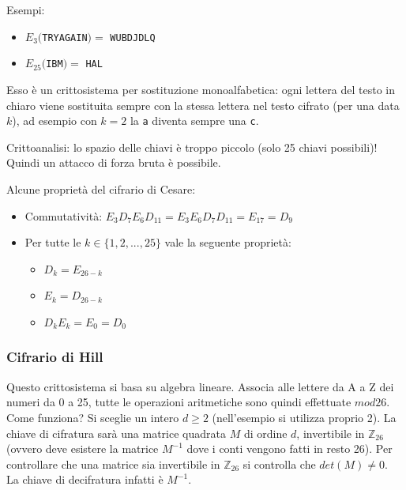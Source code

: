 Esempi:
\begin{itemize}
	\item $E_3($\texttt{TRYAGAIN}$)=$ \texttt{WUBDJDLQ}
	\item $E_{25}($\texttt{IBM}$)=$ \texttt{HAL}
\end{itemize}

Esso è un crittosistema per sostituzione monoalfabetica: ogni lettera del testo in chiaro viene sostituita sempre con la stessa lettera nel testo cifrato (per una data $k$), ad esempio con $k=2$ la \texttt{a} diventa sempre una \texttt{c}.

Crittoanalisi: lo spazio delle chiavi è troppo piccolo (solo 25 chiavi possibili)! Quindi un attacco di forza bruta è possibile.


Alcune proprietà del cifrario di Cesare:
\begin{itemize}
	\item Commutatività: $E_3D_7E_6D_{11} = E_3E_6D_7D_{11} = E_{17} = D_9$
	\item Per tutte le $k \in \{1, 2, ..., 25\}$ vale la seguente proprietà:
	\begin{itemize}
		\item $D_k=E_{26-k}$
		\item $E_k=D_{26-k}$
		\item $D_kE_k=E_0=D_0$
	\end{itemize}
\end{itemize}

\subsubsection*{Cifrario di Hill}
Questo crittosistema si basa su algebra lineare. Associa alle lettere da A a Z dei numeri da 0 a 25, tutte le operazioni aritmetiche sono quindi effettuate $mod 26$.
Come funziona? Si sceglie un intero $d \geq 2$ (nell'esempio si utilizza proprio 2). La chiave di cifratura sarà una matrice quadrata $M$ di ordine $d$, invertibile in $\mathbb{Z}_{26}$ (ovvero deve esistere la matrice $M^{-1}$ dove i conti vengono fatti in resto 26). Per controllare che una matrice sia invertibile in $\mathbb{Z}_{26}$ si controlla che $det(M) \neq 0$.\\ 
La chiave di decifratura infatti è $M^{-1}$. 


